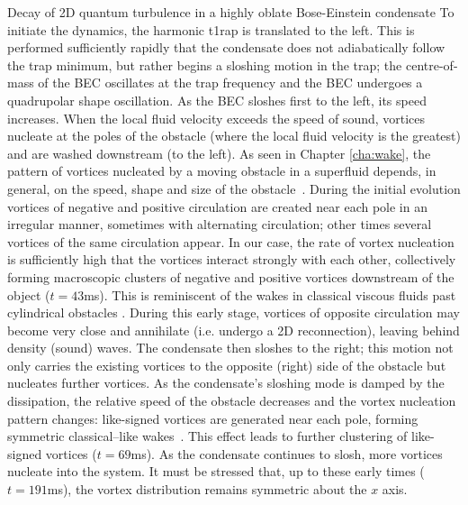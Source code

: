 \begin{chapter}{\label{cha:shin}Decay of 2D quantum turbulence in a highly oblate Bose-Einstein condensate}
To initiate the dynamics, the harmonic t1rap is translated to the left.  This is performed sufficiently rapidly that the condensate does not adiabatically follow the trap minimum, but rather begins a sloshing motion in the trap; the centre-of-mass of the BEC oscillates at the trap frequency and the BEC undergoes a quadrupolar shape oscillation. As the BEC sloshes first to the left, its speed increases.  When the local fluid velocity exceeds the speed of sound, vortices nucleate \cite{frisch92} at the poles of the obstacle
(where the local fluid velocity is the greatest) 
and are washed downstream (to the left).  
As seen in Chapter \ref{cha:wake}, the pattern of vortices nucleated by a moving obstacle 
in a superfluid depends, in general, on the  speed, shape and size of 
the obstacle~\citep{jma00,saito10,stagg_parker_14}. 
During the initial evolution vortices of negative
and positive circulation are created near each pole in an 
irregular manner, sometimes with alternating circulation;  
other times several vortices of the same circulation appear.  
In our case, the rate of vortex nucleation is sufficiently 
high that the vortices interact strongly with each other, 
collectively forming macroscopic clusters of negative and positive 
vortices downstream of the object ($t=43$ms).  This is reminiscent of the wakes in classical viscous fluids past cylindrical obstacles \cite{stagg_parker_14}.  
During this early stage, vortices of opposite 
circulation may become very close and annihilate (i.e. undergo 
a 2D reconnection), leaving behind density (sound) waves. The condensate then sloshes to the right; this 
motion not only carries the existing vortices to the opposite 
(right) side of the obstacle but nucleates further vortices. 
As the condensate's sloshing mode is damped by 
the dissipation, the relative speed of the obstacle decreases
and the vortex nucleation pattern changes: 
like-signed vortices are generated near each pole, 
forming symmetric classical--like wakes~\cite{stagg_parker_14}. 
This effect leads to further clustering of like-signed vortices   
($t=69$ms). As the condensate continues to slosh, more
vortices nucleate into the system. It must be stressed that,
up to these early times ($t=191$ms), the vortex distribution remains symmetric 
about the $x$ axis.


\end{chapter}
